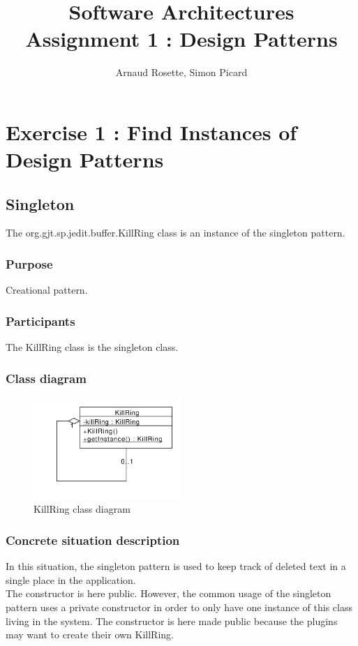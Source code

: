 \documentclass[a4paper,10pt]{article}
\title{Software Architectures\\ Assignment 1 : Design Patterns}
\author{Arnaud Rosette, Simon Picard}
\begin{document}
\maketitle%
\section{Exercise 1 : Find Instances of Design Patterns}
\subsection{Singleton}%
The org.gjt.sp.jedit.buffer.KillRing class is an instance of the singleton pattern.

\subsubsection{Purpose}
Creational pattern.
\subsubsection{Participants}
The KillRing class is the singleton class.
\subsubsection{Class diagram}
\begin{center}
\begin{figure}[h]
  \centerline{\includegraphics[width=0.5\textwidth]{singleton-killring-class-diagram.pdf}}
  \caption{KillRing class diagram}
\end{figure}
\end{center}
\subsubsection{Concrete situation description}
In this situation, the singleton pattern is used to keep track of deleted text in a single place in the application.\\
The constructor is here public. However, the common usage of the singleton pattern uses a private constructor in order to only have one instance of this class living in the system. The constructor is here made public because the plugins may want to create their own KillRing. 
\end{document}
